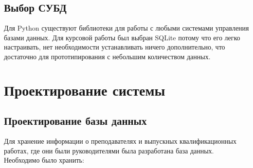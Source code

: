 \documentclass[PI,KR]{HSEUniversity}
\begin{document}
\section{Выбор СУБД}
Для Python существуют библиотеки для работы с любыми системами управления базами данных. Для курсовой работы был выбран SQLite потому что его легко настраивать, нет необходимости устанавливать ничего дополнительно, что достаточно для прототипирования с небольшим количеством данных.
\chapter{Проектирование системы}
\section{Проектирование базы данных}
Для хранение информации о преподавателях и выпускных квалификационных работах, где они были руководителями была разработана база данных. Необходимо было хранить:
\end{document}
